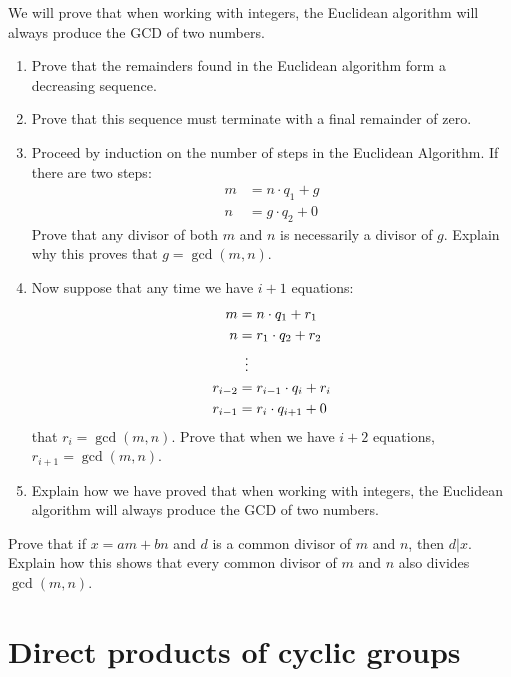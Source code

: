 \documentclass{ximera}
\begin{document}
\begin{exercise} 
We will prove that when working with integers, the Euclidean algorithm
will always produce the GCD of two numbers.
\begin{enumerate}
\item Prove that the remainders found in the Euclidean algorithm form a
  decreasing sequence.
\item Prove that this sequence must terminate with a final remainder
  of zero.
\item Proceed by induction on the number of steps in the Euclidean
  Algorithm. If there are two steps:
\begin{align*}
m &= n\cdot q_1 + g \\
n &= g\cdot q_2 +0
\end{align*}
Prove that any divisor of both $m$ and $n$ is necessarily a divisor
of $g$. Explain why this proves that $g = \gcd(m,n)$.
\item Now suppose that any time we have $i+1$ equations:
\begin{align*}
m &= n\cdot q_1 + r_1 \\
n &= r_1\cdot q_2 + r_2 \\
  &\hspace{.5em}\vdots\\
r_{i-2} &= r_{i-1}\cdot q_{i} + r_i\\
r_{i-1} &= r_{i}\cdot q_{i+1} + 0
\end{align*}
that $r_i = \gcd(m,n)$. Prove that when we have $i+2$ equations, $r_{i+1}
= \gcd(m,n)$.
\item Explain how we have proved that when working with integers, the
  Euclidean algorithm will always produce the GCD of two numbers.
\end{enumerate}
\end{exercise}


\begin{exercise} 
Prove that if $x = am +bn$ and $d$ is a common divisor of $m$ and $n$,
then $d|x$. Explain how this shows that every common divisor of $m$
and $n$ also divides $\gcd(m,n)$.
\end{exercise}







\section{Direct products of cyclic groups}
\end{document}

